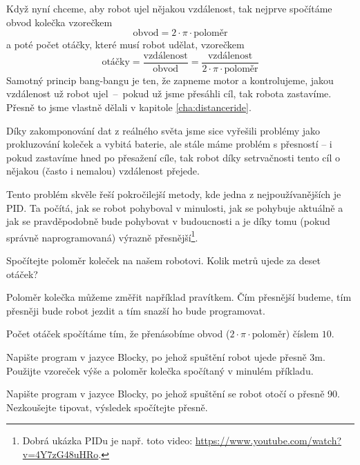 \documentclass[../main.tex]{subfiles}
\begin{document}
	Když nyní chceme, aby robot ujel nějakou vzdálenost, tak nejprve spočítáme obvod kolečka vzorečkem
	$$\text{obvod} = 2 \cdot \pi \cdot \text{poloměr}$$
	a poté počet otáčky, které musí robot udělat, vzorečkem
	$$\text{otáčky} = \frac{\text{vzdálenost}}{\text{obvod}} =  \frac{\text{vzdálenost}}{2 \cdot \pi \cdot \text{poloměr}}$$ 
	Samotný princip bang-bangu je ten, že zapneme motor a kontrolujeme, jakou vzdálenost už robot ujel~--~pokud už jsme přesáhli cíl, tak robota zastavíme. Přesně to jsme vlastně dělali v kapitole \ref{cha:distanceride}.

	Díky zakomponování dat z reálného světa jsme sice vyřešili problémy jako prokluzování koleček a vybitá baterie, ale stále máme problém s přesností -- i pokud zastavíme hned po přesažení cíle, tak robot díky setrvačnosti tento cíl o nějakou (často i nemalou) vzdálenost přejede.

	Tento problém skvěle řeší pokročilejší metody, kde jedna z nejpoužívanějších je PID. Ta počítá, jak se robot pohyboval v minulosti, jak se pohybuje aktuálně a jak se pravděpodobně bude pohybovat v budoucnosti a je díky tomu (pokud správně naprogramovaná) výrazně přesnější\footnote{Dobrá ukázka PIDu je např. toto video: \href{https://www.youtube.com/watch?v=4Y7zG48uHRo}{https://www.youtube.com/watch?v=4Y7zG48uHRo}.}. 

	\begin{question}
		Spočítejte poloměr koleček na našem robotovi. Kolik metrů ujede za deset otáček?
	\end{question}

	\begin{solution}
		Poloměr kolečka můžeme změřit například pravítkem. Čím přesnější budeme, tím přesněji bude robot jezdit a tím snazší ho bude programovat.

		Počet otáček spočítáme tím, že přenásobíme obvod ($2 \cdot \pi \cdot \text{poloměr}$) číslem $10$.
	\end{solution}

	\begin{question}
		Napište program v jazyce Blocky, po jehož spuštění robot ujede přesně \si{3m}. Použijte vzoreček výše a poloměr kolečka spočítaný v minulém příkladu.
	\end{question}

	\begin{question*}
		Napište program v jazyce Blocky, po jehož spuštění se robot otočí o přesně 90\degree. Nezkoušejte tipovat, výsledek spočítejte přesně.
	\end{question*}
\end{document}
